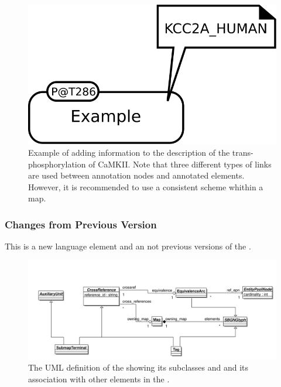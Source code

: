 \begin{figure}[htb]
  \centering
  \includegraphics[scale = 0.5]{examples/ex-annotation}
  \caption{Example of  adding information to the description of the trans-phosphorylation of CaMKII. Note that three different types of links are used between annotation nodes and annotated elements. However, it is recommended to use a consistent scheme whithin a map.}
  \label{fig:techref:ex-annotation}
\end{figure}

\subsubsection{Changes from Previous Version}

This is a new language element and an not previous versions of the \PDl.


\label{defn:CrossReference}

\begin{figure}[htb]
  \centering
  \includegraphics[width = \textwidth]{images/crossreferenceuml}
  \caption{The UML definition of the  showing
    its subclasses  and  and
    its association with other elements in the \PDl.}
  \label{fig:techref:crossreferenceuml}
\end{figure}


